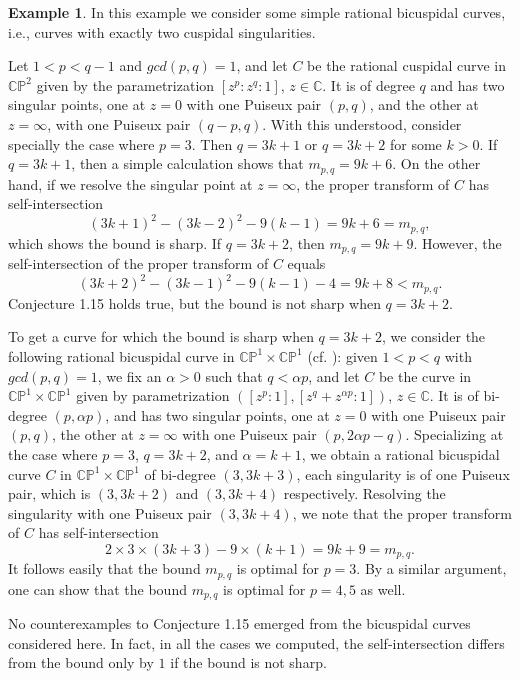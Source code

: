 \documentclass[11pt]{amsart}
\theoremstyle{plain}
\numberwithin{theorem}{section}
\theoremstyle{definition}
\newtheorem{example}[theorem]{Example}
\newcommand{\C}{{\mathbb C}}
\renewcommand{\P}{{\mathbb P}}
\begin{document}
\begin{example}
In this example we consider some simple rational bicuspidal curves, i.e., curves with exactly two cuspidal singularities. 

Let $1<p<q-1$ and $gcd(p,q)=1$, and let $C$ be the rational cuspidal curve in $\C\P^2$ given by the parametrization $[z^p: z^q:1]$, $z\in\C$. It is of degree $q$ and has two singular points, one at $z=0$ with one Puiseux pair 
$(p,q)$, and the other at $z=\infty$, with one Puiseux pair $(q-p,q)$. With this understood, consider specially 
the case where $p=3$. Then $q=3k+1$ or $q=3k+2$ for some $k>0$. If $q=3k+1$, then a simple calculation 
shows that $m_{p,q}=9k+6$. On the other hand, if we resolve the singular point at $z=\infty$, the proper 
transform of $C$ has self-intersection 
$$
(3k+1)^2-(3k-2)^2-9(k-1)=9k+6=m_{p,q},
$$
which shows the bound is sharp. If $q=3k+2$, then $m_{p,q}=9k+9$. However, the self-intersection of the proper transform of $C$ equals 
 $$
 (3k+2)^2-(3k-1)^2-9(k-1)-4=9k+8<m_{p,q}.
 $$
Conjecture 1.15 holds true, but the bound is not sharp when $q=3k+2$.

To get a curve for which the bound is sharp when $q=3k+2$, we consider the following rational bicuspidal curve
in $\C\P^1\times \C\P^1$ (cf. \cite{Moe}): given $1<p<q$ with $gcd(p,q)=1$, we fix an $\alpha>0$ such that
$q<\alpha p$, and let $C$ be the curve in $\C\P^1\times \C\P^1$ given by parametrization 
$([z^p:1], [z^q+z^{\alpha p}:1])$, $z\in \C$. It is of bi-degree $(p,\alpha p)$, and has two singular points, one 
at $z=0$ with one Puiseux pair $(p,q)$, the other at $z=\infty$ with one Puiseux pair $(p,2\alpha p-q)$.
Specializing at the case where $p=3$, $q=3k+2$, and $\alpha=k+1$, we obtain a rational bicuspidal curve $C$
in $\C\P^1\times \C\P^1$ of bi-degree $(3, 3k+3)$, each singularity is of one Puiseux pair, which is 
$(3,3k+2)$ and $(3, 3k+4)$ respectively. Resolving the singularity with one Puiseux pair $(3, 3k+4)$, we note that
the proper transform of $C$ has self-intersection
$$
2\times 3\times (3k+3)- 9\times (k+1)=9k+9=m_{p,q}.
$$
It follows easily that the bound $m_{p,q}$ is optimal for $p=3$. By a similar argument, one can show that
the bound $m_{p,q}$ is optimal for $p=4,5$ as well. 

No counterexamples to Conjecture 1.15 emerged from the bicuspidal curves considered here. In fact, in all the cases we computed, the self-intersection differs from the bound only by $1$ if the bound is not sharp. 

\end{example}
\end{document}
